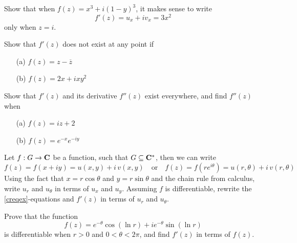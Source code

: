 \vspace{0.1in}

\begin{problem}\label{prob 7.2}
Show that when $f(z) = x^3 + i(1 - y)^3$, it makes sense to write
\[f'(z) = u_x + iv_x = 3x^2\]
only when $z = i$.
\end{problem}

\vspace{0.1in}

\begin{problem}\label{prob 7.3}
Show that $f'(z)$ does not exist at any point if
\begin{itemize}
\item[(a)] $f(z) = z - \overline{z}$
\item[(b)] $f(z) = 2x + ixy^2$
\end{itemize}
\end{problem}

\vspace{0.1in}

\begin{problem}\label{prob 7.4}
Show that $f'(z)$ and its derivative $f''(z)$ exist everywhere, and find $f''(z)$ when
\begin{itemize}
\item[(a)] $f(z) = iz + 2$
\item[(b)] $f (z) = e^{-x}e^{-iy}$
\end{itemize}
\end{problem}

\vspace{0.1in}

\begin{problem}\label{prob 7.5}
Let $f: G \to \mathbf C$ be a function, such that $G \subseteq \mathbf C^*$, then we can write
\[f(z) = f(x + iy) = u(x,y) + i\,v(x,y)\quad \text{or}\quad f(z) = f(re^{i\theta}) = u(r,\theta) + i\,v(r,\theta)\]
Using the fact that $x = r\cos\theta$ and $y = r\sin\theta$ and the chain rule from calculus, write $u_r$ and $u_\theta$ in terms of $u_x$ and $u_y$. Assuming $f$ is differentiable, rewrite the \ref{creqex}-equations and $f'(z)$ in terms of $u_r$ and $u_\theta$.
\end{problem}

\vspace{0.1in}

\begin{problem}\label{prob 7.6}
Prove that the function
\[f(z) = e^{-\theta}\cos(\ln r) + ie^{-\theta}\sin(\ln r)\]
is differentiable when $r > 0$ and $0 < \theta < 2\pi$, and find $f'(z)$ in terms of $f(z)$.
\end{problem}